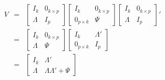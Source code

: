 \documentclass[12pt]{article}
\theoremstyle{definition}
\begin{document}
	\begin{eqnarray*}
		V &=& \left[\begin{array}{cc}
		I_k & 0_{k\times p} \\ \Lambda & I_{p}
	\end{array}\right]
\left[\begin{array}{cc}
		I_k & 0_{k\times p} \\ 0_{p\times k} & \Psi
	\end{array}\right]
	\left[\begin{array}{cc}
		I_k & 0_{k\times p} \\ \Lambda & I_{p}
	\end{array}\right]'\\
	&=& \left[ \begin{array}
		{cc} 
		I_k & 0_{k\times p}\\
		\Lambda & \Psi
	\end{array}\right]\left[\begin{array}{cc}
		I_k & \Lambda '\\
		0_{p\times k} & I_{p} 
	\end{array}\right]\\
	&=& \left[\begin{array}
		{cc}
		I_k & \Lambda' \\
		\Lambda & \Lambda \Lambda' + \Psi
	\end{array}\right]
	\end{eqnarray*}
\end{document}
